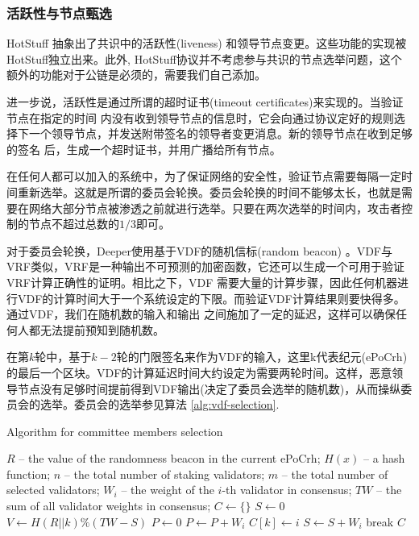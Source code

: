 \documentclass[a4paper]{article}
\begin{document}
\subsubsection{活跃性与节点甄选}
HotStuff 抽象出了共识中的活跃性(liveness) 和领导节点变更。这些功能的实现被HotStuff独立出来。此外, HotStuff协议并不考虑参与共识的节点选举问题，这个额外的功能对于公链是必须的，需要我们自己添加。

进一步说，活跃性是通过所谓的超时证书(timeout certificates)来实现的。当验证节点在指定的时间     内没有收到领导节点的信息时，它会向通过协议定好的规则选择下一个领导节点，并发送附带签名的领导者变更消息。新的领导节点在收到足够的签名
后，生成一个超时证书，并用广播给所有节点。

在任何人都可以加入的系统中，为了保证网络的安全性，验证节点需要每隔一定时间重新选举。这就是所谓的委员会轮换。委员会轮换的时间不能够太长，也就是需要在网络大部分节点被渗透之前就进行选举。只要在两次选举的时间内，攻击者控制的节点不超过总数的$1/3$即可。

对于委员会轮换，Deeper使用基于VDF的随机信标(random beacon) \cite{boneh2018verifiable}。VDF与VRF类似，VRF是一种输出不可预测的加密函数，它还可以生成一个可用于验证VRF计算正确性的证明。相比之下，VDF 需要大量的计算步骤，因此任何机器进行VDF的计算时间大于一个系统设定的下限。而验证VDF计算结果则要快得多。通过VDF，我们在随机数的输入和输出
之间施加了一定的延迟，这样可以确保任何人都无法提前预知到随机数。

在第$k$轮中，基于$k-2$轮的门限签名来作为VDF的输入，这里k代表纪元(ePoCrh)的最后一个区块。VDF的计算延迟时间大约设定为需要两轮时间。这样，恶意领导节点没有足够时间提前得到VDF输出(决定了委员会选举的随机数)，从而操纵委员会的选举。委员会的选举参见算法 \ref{alg:vdf-selection}.



\begin{algorithm} [hh]
\caption{Algorithm for committee members selection}
\label{alg:vdf-selection}
\begin{algorithmic} [1]
\State $R$ -- the value of the randomness beacon in the current ePoCrh;
\State $H(x)$ -- a hash function;
\State $n$ -- the total number of staking validators;
\State $m$ -- the total number of selected validators;
\State $W_i$ -- the weight of the $i$-th validator in consensus;
\State $TW$ -- the sum of all validator weights in consensus;
\State
\State $C \leftarrow \{\}$
\State $S \leftarrow 0$
    \State $V \leftarrow H(R||k) \% (TW-S)$
    \State $P \leftarrow 0$
        \State $P \leftarrow P + W_i$
            \State $C[k] \leftarrow i$
            \State $S \leftarrow S + W_i$
            \State break
        \EndIf
    \EndFor
\EndFor
\State \Return $C$
\end{algorithmic}
\end{algorithm}
\end{document}
